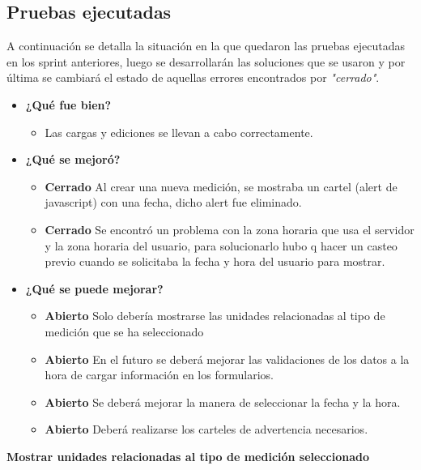 \subsection{Pruebas ejecutadas}
A continuación se detalla la situación en la que quedaron las pruebas ejecutadas en los sprint anteriores, luego se desarrollarán las soluciones que se usaron y por última se cambiará el estado de aquellas errores encontrados por \textit{"cerrado"}.
	\begin{itemize}
		\item \textbf{¿Qué fue bien?}
        	\begin{itemize}
				\item        Las cargas y ediciones se llevan a cabo correctamente.
			\end{itemize}

   		\item \textbf{¿Qué se mejoró?}
        	\begin{itemize}
				\item \textbf{Cerrado} Al crear una nueva medición, se mostraba un cartel (alert de javascript) con una fecha, dicho alert fue eliminado.
                \item \textbf{Cerrado} Se encontró un problema con la zona horaria que usa el servidor y la zona horaria del usuario, para solucionarlo hubo q hacer un casteo previo cuando se solicitaba la fecha y hora del usuario para mostrar.
			\end{itemize}

   		\item \textbf{¿Qué se puede mejorar?}
        	\begin{itemize}
		        \item \textbf{Abierto} Solo debería mostrarse las unidades relacionadas al tipo de medición que se ha seleccionado 
				\item \textbf{Abierto} En el futuro se deberá mejorar las validaciones de los datos a la hora de cargar información en los formularios.
        		\item \textbf{Abierto} Se deberá mejorar la manera de seleccionar la fecha y la hora. 
                \item \textbf{Abierto} Deberá realizarse los carteles de advertencia necesarios.
            \end{itemize}
       
	\end{itemize}

\textbf{Mostrar unidades relacionadas al tipo de medición seleccionado}

